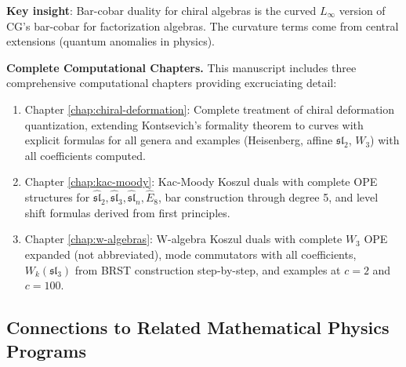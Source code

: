 \textbf{Key insight}: Bar-cobar duality for chiral algebras is the curved $L_\infty$ 
version of CG's bar-cobar for factorization algebras. The curvature terms come from 
central extensions (quantum anomalies in physics).

\medskip
\noindent
\textbf{Complete Computational Chapters.} This manuscript includes three comprehensive computational chapters providing excruciating detail:
\begin{enumerate}
\item Chapter \ref{chap:chiral-deformation}: Complete treatment of chiral deformation quantization, extending Kontsevich's formality theorem to curves with explicit formulas for all genera and examples (Heisenberg, affine $\mathfrak{sl}_2$, $W_3$) with all coefficients computed.
\item Chapter \ref{chap:kac-moody}: Kac-Moody Koszul duals with complete OPE structures for $\widehat{\mathfrak{sl}}_2, \widehat{\mathfrak{sl}}_3, \widehat{\mathfrak{sl}}_n, \widehat{E}_8$, bar construction through degree 5, and level shift formulas derived from first principles.
\item Chapter \ref{chap:w-algebras}: W-algebra Koszul duals with complete $W_3$ OPE expanded (not abbreviated), mode commutators with all coefficients, $W_k(\mathfrak{sl}_3)$ from BRST construction step-by-step, and examples at $c=2$ and $c=100$.
\end{enumerate}

\subsection{Connections to Related Mathematical Physics Programs}
\label{subsec:related-programs}

